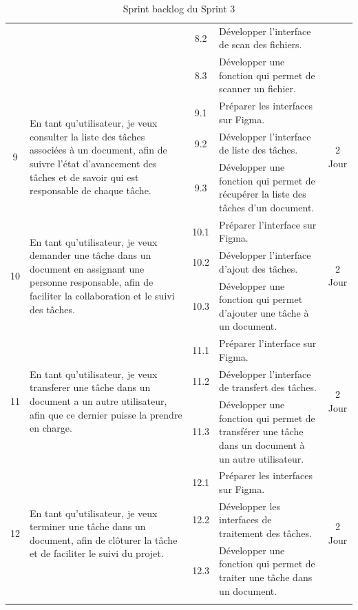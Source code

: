 \begin{adjustwidth}{-1cm}{}
\begin{longtable}{|c|p{6cm}|c|p{6cm}|c|}
      & & 8.2 & Développer l'interface de scan des fichiers. & \\
      \cline{3-4}
      & & 8.3 & Développer une fonction qui permet de scanner un fichier. & \\
      \cline{1-5}
      \multirow{3}{*}{9} & \multirow{3}{6cm}{En tant qu'utilisateur, je veux consulter la liste des tâches associées à un document, afin de suivre l'état d'avancement des tâches et de savoir qui est responsable de chaque tâche.} & 9.1 & Préparer les interfaces sur Figma. & \multirow{3}{*}{2 Jour} \\
      \cline{3-4}
      & & 9.2 & Développer l'interface de liste des tâches. & \\
      \cline{3-4}
      & & 9.3 & Développer une fonction qui permet de récupérer la liste des tâches d'un document. & \\
      \cline{1-5}
      \multirow{3}{*}{10} & \multirow{3}{6cm}{En tant qu'utilisateur, je veux demander une tâche dans un document en assignant une personne responsable, afin de faciliter la collaboration et le suivi des tâches.} & 10.1 & Préparer l'interface sur Figma. & \multirow{3}{*}{2 Jour} \\
      \cline{3-4}
      & & 10.2 & Développer l'interface d'ajout des tâches. & \\
      \cline{3-4}
      & & 10.3 & Développer une fonction qui permet d'ajouter une tâche à un document. & \\
      \cline{1-5}
      \multirow{3}{*}{11} & \multirow{3}{6cm}{En tant qu'utilisateur, je veux transferer une tâche dans un document a un autre utilisateur, afin que ce dernier puisse la prendre en charge.} & 11.1 & Préparer l'interface sur Figma. & \multirow{3}{*}{2 Jour} \\
      \cline{3-4}
      & & 11.2 & Développer l'interface de transfert des tâches. & \\
      \cline{3-4}
      & & 11.3 & Développer une fonction qui permet de transférer une tâche dans un document à un autre utilisateur. & \\
      \cline{1-5}
      \multirow{3}{*}{12} &\multirow{3}{6cm}{En tant qu'utilisateur, je veux terminer une tâche dans un document, afin de clôturer la tâche et de faciliter le suivi du projet.} & 12.1 & Préparer les interfaces sur Figma. & \multirow{3}{*}{2 Jour} \\
      \cline{3-4}
      & & 12.2 & Développer les interfaces de traitement des tâches. & \\
      \cline{3-4}
      & & 12.3 & Développer une fonction qui permet de traiter une tâche dans un document. & \\
      \cline{1-5}
  \hline
  \caption{Sprint backlog du Sprint 3}
  \label{tab:sprint-backlog-3}
\end{longtable}
\end{adjustwidth}



